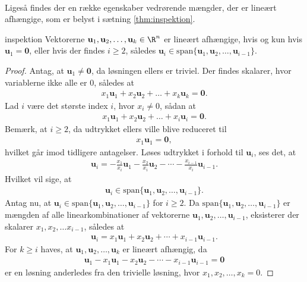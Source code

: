 \\
%
%
Ligeså findes der en række egenskaber vedrørende mængder, der er lineært afhængige, som er belyst i sætning \ref{thm:inspektion}.
%
%
\begin{thm}{}{inspektion}
%
Vektorerne $\mathbf{u}_1,\mathbf{u}_2, \ldots ,\mathbf{u}_k \in\R^n$ er lineært afhængige, 
hvis og kun hvis $\mathbf{u}_1=\mathbf{0}$, eller hvis der findes $i \geq 2$, således $\mathbf{u}_i \in \text{span} \{ \mathbf{u}_1,\mathbf{u}_2, \ldots ,\mathbf{u}_{i-1} \}$.
%
\end{thm}
%
%
\begin{proof}
% 
Antag, at $\mathbf{u}_1 \neq \mathbf{0}$, da løsningen ellers er triviel. 
Der findes skalarer, hvor variablerne ikke alle er $0$, således at
% 
\begin{align*}
x_1 \mathbf{u}_1 + x_2 \mathbf{u}_2 + \ldots + x_k \mathbf{u}_k = \mathbf{0}.
\end{align*}
%
Lad $i$ være det største index $i$, hvor $x_i \neq 0$, sådan at 
\begin{align*}
x_1 \mathbf{u}_1 + x_2 \mathbf{u}_2 + \ldots + x_i \mathbf{u}_i = \mathbf{0}.
\end{align*}
Bemærk, at $i\geq2$, da udtrykket ellers ville blive reduceret til
%
\begin{align*}
x_1\textbf{u}_1=\mathbf{0},
\end{align*}
%
hvilket går imod tidligere antagelser.
Løses udtrykket i forhold til $\mathbf{u}_i$, ses det, at
\begin{align*}
\mathbf{u}_i = - \frac{x_1}{x_i} \mathbf{u}_1 - \frac{x_2}{x_i} \mathbf{u}_2 - \cdots - \frac{x_{i-1}}{x_i} \mathbf{u}_{i-1}.
\end{align*}
Hvilket vil sige, at 
\begin{align*}
\mathbf{u}_i \in \text{span}\{ \mathbf{u}_1,\mathbf{u}_2, \ldots ,\mathbf{u}_{i-1} \}.
\end{align*}
%
Antag nu, at $\mathbf{u}_i \in \text{span}\{ \mathbf{u}_1,\mathbf{u}_2, \ldots ,\mathbf{u}_{i-1} \}$ for $i \geq 2$.
Da $\text{span}\{ \mathbf{u}_1,\mathbf{u}_2, \ldots ,\mathbf{u}_{i-1} \}$ er mængden af alle linearkombinationer af vektorerne $\mathbf{u}_1,\mathbf{u}_2, \ldots ,\mathbf{u}_{i-1}$, eksisterer der skalarer $x_1, x_2, \ldots x_{i-1}$, således at
%
\begin{align*}
\textbf{u}_i=x_1\mathbf{u}_1 + x_2 \mathbf{u}_2 + \cdots + x_{i-1}\mathbf{u}_{i-1}.
\end{align*}
%
For $k \geq i$ haves, at $\mathbf{u}_1,\mathbf{u}_2, \ldots ,\mathbf{u}_k$ er lineært afhængig, da 
\begin{align*}
\textbf{u}_1 -x_1\textbf{u}_1 - x_2\textbf{u}_2 - \cdots - x_{i-1}\textbf{u}_{i-1} = \textbf{0}
\end{align*} 
er en løsning anderledes fra den trivielle løsning, hvor $x_1, x_2,\ldots,x_k=0$.
%
\end{proof}
